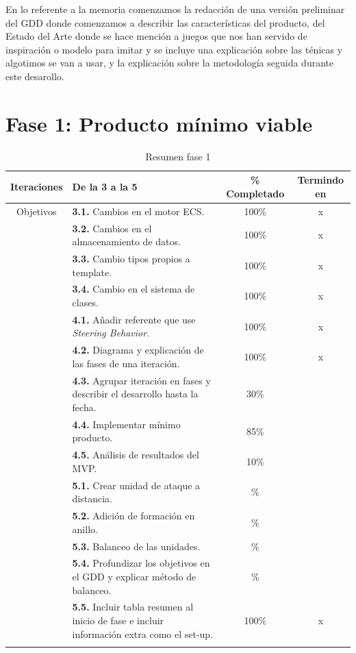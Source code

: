 En lo referente a la memoria comenzamos la redacción de una versión preliminar del \ac{GDD}
donde comenzamos a describir las características del producto, del Estado del Arte donde se hace
mención a juegos que nos han servido de inspiración o modelo para imitar y se incluye una explicación
sobre las ténicas y algotimos se van a usar, y la explicación sobre la metodología seguida durante
este desarollo. 

\newpage

\section{Fase 1: Producto mínimo viable}

\begin{longtable}[c]{|c|p{7cm}|c|c|}
\hline
Iteraciones & De la 3 a la 5                                               & \% Completado & Termindo en \\ 
\hline
Objetivos   &   \textbf{3.1.} Cambios en el motor ECS.                     & 100\% & x \\
	\cmidrule[.006pt]{2-4}
			&   \textbf{3.2.} Cambios en el almacenamiento de datos.       & 100\% & x \\ 
	\cmidrule[.006pt]{2-4}
			&	\textbf{3.3.} Cambio tipos propios a template.             & 100\% & x \\ 
	\cmidrule[.006pt]{2-4}
			&	\textbf{3.4.} Cambio en el sistema de clases.              & 100\% & x \\
\cmidrule[1pt]{2-4}
			&	\textbf{4.1.} Añadir referente que use 
								\textit{Steering Behavior}.                & 100\% & x \\
	\cmidrule[.006pt]{2-4}
			&	\textbf{4.2.} Diagrama y explicación de las fases de 
								una iteración.                             & 100\% & x \\
	\cmidrule[.006pt]{2-4}
			&   \textbf{4.3.} Agrupar iteración en fases y describir el
								desarrollo hasta la fecha.                 & 30\%  &  \\
	\cmidrule[.006pt]{2-4}
			&   \textbf{4.4.} Implementar mínimo producto.                 & 85\%  &  \\
	\cmidrule[.006pt]{2-4}
			&   \textbf{4.5.} Análisis de resultados del MVP.              & 10\%  &  \\
\cmidrule[1.5pt]{2-4}
			&   \textbf{5.1.} Crear unidad de ataque a distancia.          & \% &  \\
	\cmidrule[.006pt]{2-4}
			&   \textbf{5.2.} Adición de formación en anillo.              & \% &  \\ 
	\cmidrule[.006pt]{2-4}
			&	\textbf{5.3.} Balanceo de las unidades.                    & \% &  \\ 
	\cmidrule[.006pt]{2-4}		
			&	\textbf{5.4.} Profundizar los objetivos en el GDD y 
								explicar método de balanceo.               & \% &  \\ 
	\cmidrule[.006pt]{2-4}		
			&	\textbf{5.5.} Incluir tabla resumen al inicio de fase
								e incluir información extra como el set-up.& 100\% & x \\
\hline
\caption{Resumen fase 1}
\end{longtable}

